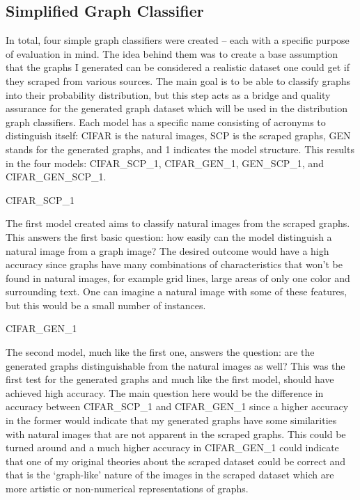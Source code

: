 \documentclass[12pt]{article}
\begin{document}
        \subsection{Simplified Graph Classifier}

            In total, four simple graph classifiers were created -- each with a specific purpose of evaluation in mind. 
            The idea behind them was to create a base assumption that the graphs I generated can be considered a realistic dataset 
            one could get if they scraped from various sources. 
            The main goal is to be able to classify graphs into their probability distribution, 
            but this step acts as a bridge and quality assurance for the generated graph dataset 
            which will be used in the distribution graph classifiers. 
            Each model has a specific name consisting of acronyms to distinguish itself: 
            CIFAR is the natural images, SCP is the scraped graphs, GEN stands for the generated graphs, 
            and 1 indicates the model structure. This results in the four models: CIFAR\_SCP\_1, CIFAR\_GEN\_1, GEN\_SCP\_1, and CIFAR\_GEN\_SCP\_1.

            CIFAR\_SCP\_1
            
            The first model created aims to classify natural images from the scraped graphs. 
            This answers the first basic question: how easily can the model distinguish a natural image from a graph image? 
            The desired outcome would have a high accuracy since graphs have many combinations of characteristics 
            that won’t be found in natural images, for example grid lines, large areas of only one color and surrounding text. 
            One can imagine a natural image with some of these features, but this would be a small number of instances.
            
            CIFAR\_GEN\_1
            
            The second model, much like the first one, answers the question: 
            are the generated graphs distinguishable from the natural images as well? 
            This was the first test for the generated graphs and much like the first model, 
            should have achieved high accuracy. The main question here would be the difference in accuracy between CIFAR\_SCP\_1 
            and CIFAR\_GEN\_1 since a higher accuracy in the former would indicate 
            that my generated graphs have some similarities with natural images that are not apparent in the scraped graphs. 
            This could be turned around and a much higher accuracy in CIFAR\_GEN\_1 could indicate 
            that one of my original theories about the scraped dataset could be correct 
            and that is the ‘graph-like’ nature of the images in the scraped dataset which are more artistic 
            or non-numerical representations of graphs.
            
\end{document}
